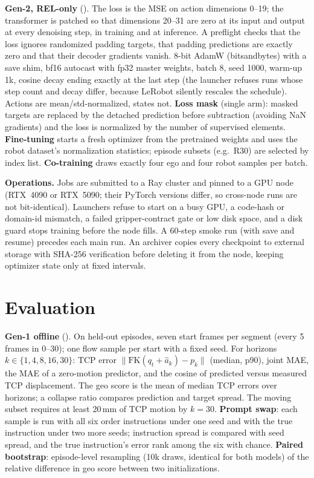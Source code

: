 \documentclass[conference,10pt]{IEEEtran}
\newcommand{\mm}{\,mm\xspace}
\begin{document}
\textbf{Gen-2, REL-only} (). The loss is the MSE on action dimensions 0--19; the transformer is patched so that
dimensions 20--31 are zero at its input and output at every denoising step, in training and at inference. A preflight checks that the
loss ignores randomized padding targets, that padding predictions are exactly zero and that their decoder gradients vanish. 8-bit
AdamW (bitsandbytes) with a save shim, bf16 autocast with fp32 master weights, batch 8, seed 1000, warm-up 1k, cosine decay ending
exactly at the last step (the launcher refuses runs whose step count and decay differ, because LeRobot silently rescales the
schedule). Actions are mean/std-normalized, states not. \textbf{Loss mask} (single arm): masked targets are replaced by the detached
prediction before subtraction (avoiding NaN gradients) and the loss is normalized by the number of supervised elements.
\textbf{Fine-tuning} starts a fresh optimizer from the pretrained weights and uses the robot dataset's normalization statistics;
episode subsets (e.g.\ R30) are selected by index list. \textbf{Co-training} draws exactly four ego and four robot samples per batch.

\textbf{Operations.} Jobs are submitted to a Ray cluster and pinned to a GPU node (RTX~4090 or RTX~5090; their PyTorch versions
differ, so cross-node runs are not bit-identical). Launchers refuse to start on a busy GPU, a code-hash or domain-id mismatch, a
failed gripper-contract gate or low disk space, and a disk guard stops training before the node fills. A 60-step smoke run (with
save and resume) precedes each main run. An archiver copies every checkpoint to external storage with SHA-256 verification before
deleting it from the node, keeping optimizer state only at fixed intervals.

\section{Evaluation}\label{m:sec:eval}
\textbf{Gen-1 offline} (). On held-out episodes, seven start frames per segment (every 5 frames
in 0--30); one flow sample per start with a fixed seed. For horizons $k\in\{1,4,8,16,30\}$: TCP error $\lVert\mathrm{FK}(q_t+\hat
a_k)-p_k\rVert$ (median, p90), joint MAE, the MAE of a zero-motion predictor, and the cosine of predicted versus measured TCP
displacement. The geo score is the mean of median TCP errors over horizons; a collapse ratio compares prediction and target spread.
The moving subset requires at least 20\mm{} of TCP motion by $k{=}30$. \textbf{Prompt swap}: each sample is run with all six order
instructions under one seed and with the true instruction under two more seeds; instruction spread is compared with seed spread,
and the true instruction's error rank among the six with chance. \textbf{Paired bootstrap}: episode-level resampling (10k draws,
identical for both models) of the relative difference in geo score between two initializations.
\end{document}
